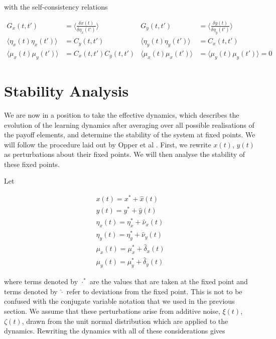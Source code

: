 \documentclass{article}
\begin{document}
with the self-consistency relations

\begin{align}
	G_x(t, t') &= \langle \frac{\delta x(t)}{\delta \eta_x(t')}\rangle  & G_y(t, t') &= \langle \frac{\delta y(t)}{\delta
	\eta_y(t')}\rangle  \\
	\langle \eta_x(t) \eta_x(t')\rangle  &= C_y(t, t') & \langle \eta_y(t) \eta_y(t')\rangle  &= C_x(t, t')\\
	\langle \mu_x(t) \mu_y(t')\rangle  &= C_x(t, t') C_y(t, t') & \langle \mu_x(t) \mu_x(t')\rangle  &= \langle \mu_y(t) \mu_y(t')\rangle  = 0
\end{align}

\section{Stability Analysis} %
\label{sec:stability_analysis}

We are now in a position to take the effective dynamics, which describes the evolution of the
learning dynamics after averaging over all possible realisations of the payoff elements, and
determine the stability of the system at fixed points. We will follow the procedure laid out by
Opper et al \cite{Opper}. First, we rewrite $x(t)$, $y(t)$ as perturbations about their fixed
points. We will then analyse the stability of these fixed points.

Let

\begin{align}
	x(t) = x^* + \hat{x}(t) \\
	y(t) = y^* + \hat{y}(t) \\
	\eta_x(t) = \eta_x^* + \hat{\nu}_x(t)\\
	\eta_y(t) = \eta_y^* + \hat{\nu}_y(t)\\
	\mu_x(t) = \mu_x^* + \hat{\delta}_x(t)\\
	\mu_y(t) = \mu_y^* + \hat{\delta}_y(t)
\end{align}

where terms denoted by $\cdot^*$ are the values that are taken at the fixed point and terms denoted
by $\hat{\cdot}$ refer to deviations from the fixed point. This is not to be confused with
the conjugate variable notation that we used in the previous section. We assume that these
perturbations arise from additive noise, $\xi(t)$, $\zeta(t)$, drawn from the unit normal
distribution which are applied to the dynamics. Rewriting the dynamics with all of these
considerations gives
\end{document}
